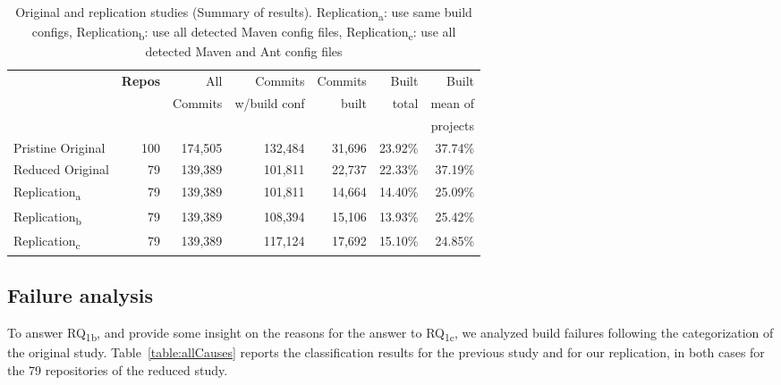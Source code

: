 \begin{table*}[h]
\caption{Original and replication studies (Summary of results). Replication\textsubscript{a}: use same build configs, Replication\textsubscript{b}: use all detected Maven config files, Replication\textsubscript{c}: use all detected Maven and Ant config files}
\label{table:replication-buidability-summary}
\begin{center}
\begin{tabular}{lrrrrrr}
\toprule
 & \bf{Repos}            & All     & Commits           & Commits & Built & Built \\
 &                              & Commits & w/build conf    & built   & total          & mean of\\
 &                              &         &                   &         &                & projects \\
\midrule 
Pristine Original               & 100     & 174,505 & 132,484 & 31,696  & 23.92\%        & 37.74\% \\
Reduced Original                &  79     & 139,389 & 101,811 & 22,737  & 22.33\%        & 37.19\% \\
Replication\textsubscript{a}    &  79     & 139,389 & 101,811 & 14,664  & 14.40\%        & 25.09\% \\
Replication\textsubscript{b}    &  79     & 139,389 & 108,394 & 15,106  & 13.93\%        & 25.42\% \\
Replication\textsubscript{c}    &  79     & 139,389 & 117,124 & 17,692  & 15.10\%        & 24.85\% \\  
\bottomrule
\end{tabular}
\end{center}
\end{table*}


\subsection{Failure analysis}

To answer RQ\textsubscript{1b}, and provide some insight on the reasons for the answer to RQ\textsubscript{1c}, we analyzed build failures following the categorization of the original study. Table~\ref{table:allCauses} reports the classification results for the previous study and for our replication, in both cases for the 79 repositories of the reduced study.

